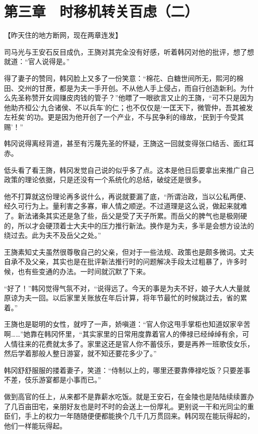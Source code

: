 \section{第三章　时移机转关百虑（二）}

【昨天住的地方断网，现在两章连发】

司马光与王安石反目成仇，王旖对其完全没有好感，听着韩冈对他的批评，想了想就道：“官人说得是。”

得了妻子的赞同，韩冈脸上又多了一份笑意：“棉花、白糖世间所无，熙河的棉田、交州的甘蔗，都是为夫一手开创。不从他人手上侵占，而自行创造新利。为什么先圣称赞开女闾赚皮肉钱的管子？”他瞟了一眼欲言又止的王旖，“可不只是因为他助齐桓公‘九合诸侯、不以兵车’的仁；也不仅仅是‘一匡天下，微管仲，吾其被发左衽矣’的功。更是因为他开创了一个产业，不与民争利的缘故，‘民到于今受其赐’！”

韩冈说得离经背道，甚至有污蔑先圣的怀疑，王旖这一回就变得张口结舌、面红耳赤。

低头看了看王旖，韩冈发觉自己说的似乎多了点。这本是他日后要拿出来推广自己政策的理论依据，只是还没有一个系统化的总结，破绽还是很多。

他不打算就这份理论再多说什么，再说就要漏了底，“所谓治政，当以公私两便、经久可行为上。量利害之多寡，审人情之顺逆。不过道理是这么说，做起来就难了。新法诸条其实还是急了些，岳父是受了天子所累。而岳父的脾气也是极刚硬的，所以才会硬顶着士大夫中的压力推行新法。换作是为夫，多半是会想方设法的绕过去。此为夫不及岳父之处。”

王旖素知丈夫虽然很尊敬自己的父亲，但对于一些法规、政策也是颇多微词。丈夫自承不及父亲，其实也是在批评新法推行时的问题解决手段太过粗暴了，许多时候，也有些变通的办法。一时间就沉默了下来。

“好了！”韩冈觉得气氛不对，“说得远了。今天的事是为夫不好，娘子大人大量就原谅为夫一回。以后家里关账放在年后计算，将年节最忙的时候跳过去，省的累着。”

王旖也是聪明的女性，就哼了一声，娇嗔道：“官人你这甩手掌柜也知道奴家辛苦啊……”她靠在韩冈怀里，“其实家里的日常用度靠着官人的俸禄已经绰绰有余，可人情往来的花费就太多了。家里这还是官人你不蓄伎乐，要是再养一班歌伎女乐，然后学着那般人整日游宴，就不知还要花多少了。”

韩冈舒舒服服的搂着妻子，笑道：“侍制以上的，哪里还要靠俸禄吃饭？只要差事不差，伎乐游宴都是小事而已。”

做到高官的任上，从来都不是靠薪水吃饭。就是王安石，在金陵也是陆陆续续置办了几百亩田宅，亲朋好友也是时不时的会送上一份厚礼。更别说一干和光同尘的重臣们，手上的权力一年随随便便都能换个几千几万贯回来。韩冈现在能玩得起的，他们一样能玩得起。

